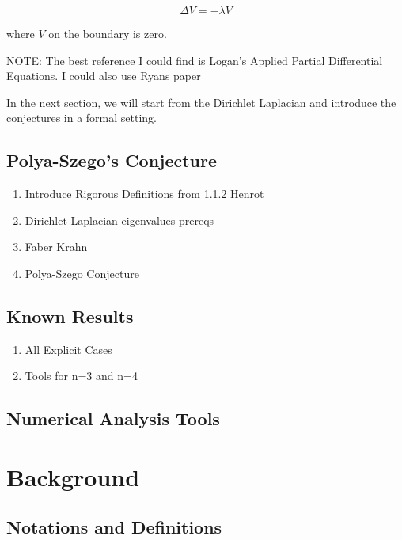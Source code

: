 \documentclass[12pt]{report}
\numberwithin{definition}{section}
\begin{document}
$$ \Delta V = - \lambda V $$

where $V$ on the boundary is zero.

NOTE: The best reference I could find is Logan's Applied Partial Differential Equations.
I could also use Ryans paper

In the next section, we will start from the Dirichlet Laplacian and introduce the conjectures in a formal setting.

\break

\section {Polya-Szego's Conjecture}


\begin{enumerate}
  \item Introduce Rigorous Definitions from 1.1.2 Henrot
  \item Dirichlet Laplacian eigenvalues prereqs
  \item Faber Krahn
  \item Polya-Szego Conjecture \cite{isoperimetric}
\end{enumerate}

\break

\section{Known Results}

\begin{enumerate}
  \item All Explicit Cases
  \item Tools for n=3 and n=4
\end{enumerate}

\break

\section {Numerical Analysis Tools}
\break

\chapter {Background}

\break

\section{Notations and Definitions}
\end{document}
